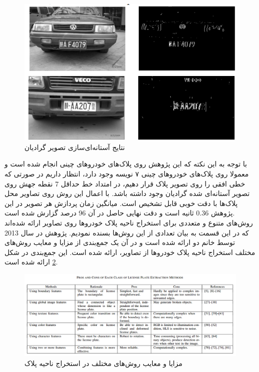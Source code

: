 \documentclass[12pt,a4paper]{article}
\begin{document}
\begin{figure}[h]
\centering
\includegraphics[scale=0.4]{Imgs/grad1.png}
\caption{نتایج آستانه‌ای‌سازی تصویر گرادیان \cite{xu2005new}}
\label{fig:grad1}
\end{figure}

با توجه به این‌ نکته که این پژوهش روی پلاک‌های خودروهای چینی انجام شده است و معمولا روی پلاک‌های خودروهای چینی ۷ نویسه وجود دارد، انتظار داریم در صورتی که خطی افقی را روی تصویر پلاک قرار دهیم، در امتداد خط حداقل  7 نقطه جهش روی تصویر آستانه‌ای شده گرادیان وجود داشته باشد. با اعمال این روش روی تصاویر محل پلاک‌ها با دقت خوبی قابل تشخیص است. میانگین زمان پردازش هر تصویر در این پژوهش 0.36 ثانیه است و دقت نهایی حاصل در آن 96 درصد گزارش شده است.
\\
روش‌های متنوع و متعددی برای استخراج ناحیه پلاک خودروها روی تصاویر ارائه شده‌اند که در این قسمت به بیان تعدادی از این روش‌ها بسنده نمودیم. پژوهش \cite{du2013automatic}  در سال 2013 توسط خانم دو ارائه شده است و در آن یک جمع‌بندی از مزایا و معایب روش‌های مختلف استخراج ناحیه پلاک خودروها از تصاویر، ارائه شده است. این جمع‌بندی در شکل \ref{fig:sumtbl1} ارائه شده است.

\begin{figure}[h]
\centering
\includegraphics[scale=0.4]{Imgs/sumtbl1.png}
\caption{مزایا و معایب روش‌های مختلف در استخراج ناحیه پلاک \cite{du2013automatic}}
\label{fig:sumtbl1}
\end{figure}
\end{document}
